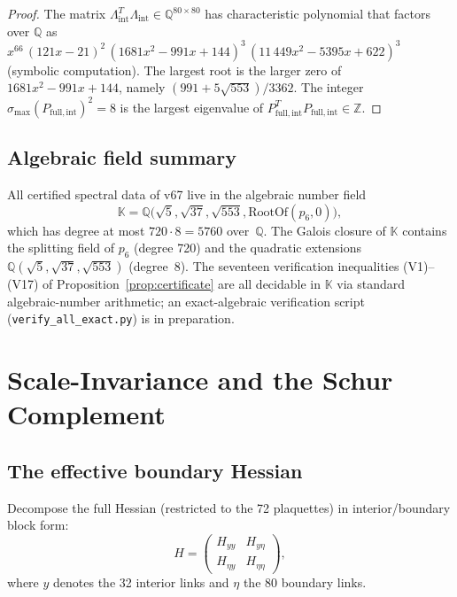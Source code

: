 \documentclass[11pt]{article}
\theoremstyle{definition}
\newcommand{\Z}{\mathbb{Z}}
\newcommand{\Q}{\mathbb{Q}}
\begin{document}
\begin{proof}
The matrix $\Lambda_{\mathrm{int}}^T\Lambda_{\mathrm{int}}\in\Q^{80\times 80}$
has characteristic polynomial that factors over $\Q$ as
$x^{66}\,(121x-21)^2\,(1681x^2-991x+144)^3\,(11\,449x^2-5395x+622)^3$
(symbolic computation).  The largest root is the larger zero of
$1681x^2-991x+144$, namely $(991+5\sqrt{553})/3362$.
The integer $\sigma_{\max}(P_{\mathrm{full,int}})^2=8$ is the
largest eigenvalue of $P_{\mathrm{full,int}}^T P_{\mathrm{full,int}}\in\Z$.
\end{proof}

\subsection{Algebraic field summary}

All certified spectral data of v67 live in the algebraic number field
\[
\mathbb{K}=\Q\bigl(\sqrt 5,\sqrt{37},\sqrt{553},\mathrm{RootOf}(p_6,0)\bigr),
\]
which has degree at most $720\cdot 8=5760$ over~$\Q$.  The Galois
closure of $\mathbb{K}$ contains the splitting field of $p_6$
(degree 720) and the quadratic extensions $\Q(\sqrt 5,\sqrt{37},
\sqrt{553})$ (degree~$8$).  The seventeen verification inequalities
(V1)--(V17) of Proposition~\ref{prop:certificate} are all decidable
in $\mathbb{K}$ via standard algebraic-number arithmetic; an
exact-algebraic verification script (\texttt{verify\_all\_exact.py})
is in preparation.

\section{Scale-Invariance and the Schur Complement}\label{sec:multiscale}

\subsection{The effective boundary Hessian}

Decompose the full Hessian (restricted to the 72 plaquettes) in
interior/boundary block form:
\begin{equation}\label{eq:blockH}
H=\begin{pmatrix} H_{yy} & H_{y\eta}\\ H_{\eta y} & H_{\eta\eta}
\end{pmatrix},
\end{equation}
where $y$ denotes the 32 interior links and $\eta$ the 80 boundary links.
\end{document}
